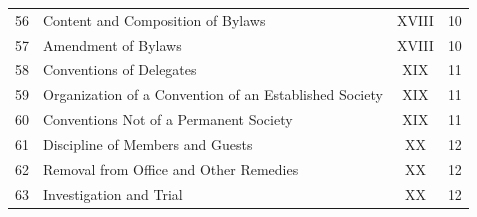 \documentclass[11pt]{article}
\begin{document}
\begin{longtable}{@{}r p{.64\linewidth} c c@{}}
56 & Content and Composition of Bylaws & XVIII & 10\\
57 & Amendment of Bylaws & XVIII & 10\\
58 & Conventions of Delegates & XIX & 11\\
59 & Organization of a Convention of an Established Society & XIX & 11\\
60 & Conventions Not of a Permanent Society & XIX & 11\\
61 & Discipline of Members and Guests & XX & 12\\
62 & Removal from Office and Other Remedies & XX & 12\\
63 & Investigation and Trial & XX & 12\\
\bottomrule\end{longtable}
\end{document}
